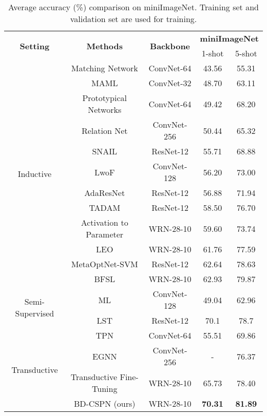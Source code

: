 \documentclass[runningheads]{llncs}
\begin{document}
\begin{table}
\small
\centering
\caption{Average accuracy (\%) comparison on miniImageNet.  Training set and validation set are used for training.} 
\begin{tabular}{ccccc}
\hline
\multirow{2}{*}{\textbf{Setting}} &  \multirow{2}{*}{\textbf{Methods}}  & \multirow{2}{*}{\textbf{Backbone}} & \multicolumn{2}{c}{\textbf{miniImageNet}}  \\ 
\cmidrule(r){4-5}
& & & 1-shot & 5-shot \\ \hline
\multirow{12}{*}{Inductive}  & Matching Network \cite{vinyals2016matching} & ConvNet-64 & 43.56 & 55.31 \\ 
& MAML \cite{finn2017model} & ConvNet-32 & 48.70 & 63.11 \\ 
& Prototypical Networks \cite{snell2017prototypical} & ConvNet-64 & 49.42 & 68.20   \\
& Relation Net \cite{sung2018learning} &  ConvNet-256 & 50.44 & 65.32  \\
& SNAIL \cite{mishra2018a} & ResNet-12 & 55.71 & 68.88\\
& LwoF \cite{gidaris2018dynamic} & ConvNet-128 & 56.20 & 73.00 \\
& AdaResNet \cite{munkhdalai2018rapid} & ResNet-12 & 56.88 & 71.94 \\
& TADAM \cite{oreshkin2018tadam} & ResNet-12 & 58.50 & 76.70 \\
& Activation to Parameter \cite{qiao2018few} & WRN-28-10 & 59.60 & 73.74 \\
& LEO \cite{rusu2019meta} & WRN-28-10 & 61.76 & 77.59 \\
& MetaOptNet-SVM \cite{lee2019meta} &  ResNet-12 & 62.64 & 78.63 \\
& BFSL \cite{gidaris2019boosting} & WRN-28-10 & 62.93 & 79.87 \\
\hline
\multirow{2}{*}{Semi-Supervised}  & ML \cite{ren2018meta}  & ConvNet-128 & 49.04 & 62.96  \\
& LST \cite{li2019learning} & ResNet-12 & 70.1 & 78.7  \\
\hline
\multirow{4}{*}{Transductive} & TPN \cite{liu2019learning} & ConvNet-64 & 55.51 & 69.86  \\
& EGNN \cite{kim2019edge} & ConvNet-256 & - & 76.37  \\
& Transductive Fine-Tuning \cite{dhillon2020a} & WRN-28-10 & 65.73 & 78.40 \\
& BD-CSPN (ours) & WRN-28-10 & \textbf{70.31} & \textbf{81.89}  \\
\hline
\end{tabular} 
\label{fsl-result-miniImagenet}
\end{table}
\end{document}
